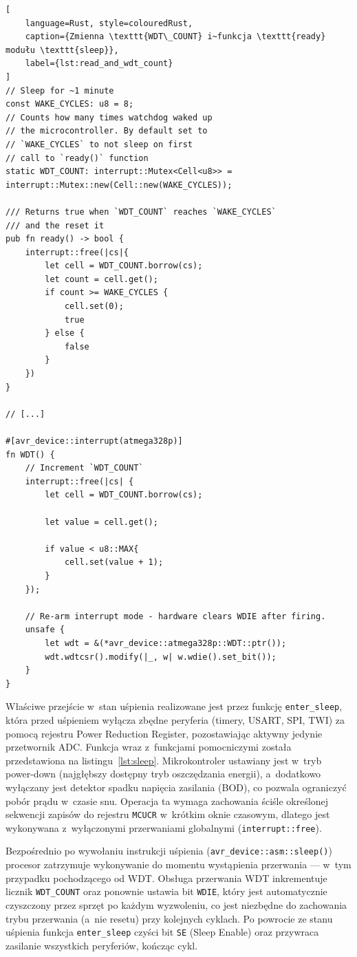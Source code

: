 \begin{lstlisting}[
    language=Rust, style=colouredRust, 
    caption={Zmienna \texttt{WDT\_COUNT} i~funkcja \texttt{ready} modułu \texttt{sleep}},
    label={lst:read_and_wdt_count}
]
// Sleep for ~1 minute
const WAKE_CYCLES: u8 = 8;
// Counts how many times watchdog waked up 
// the microcontroller. By default set to 
// `WAKE_CYCLES` to not sleep on first
// call to `ready()` function
static WDT_COUNT: interrupt::Mutex<Cell<u8>> = interrupt::Mutex::new(Cell::new(WAKE_CYCLES));

/// Returns true when `WDT_COUNT` reaches `WAKE_CYCLES`
/// and the reset it
pub fn ready() -> bool {
    interrupt::free(|cs|{
        let cell = WDT_COUNT.borrow(cs);
        let count = cell.get();
        if count >= WAKE_CYCLES {
            cell.set(0);
            true
        } else {
            false
        }
    })
}

// [...]

#[avr_device::interrupt(atmega328p)]
fn WDT() {
    // Increment `WDT_COUNT`
    interrupt::free(|cs| {
        let cell = WDT_COUNT.borrow(cs);

        let value = cell.get();
        
        if value < u8::MAX{
            cell.set(value + 1);
        }
    });

    // Re-arm interrupt mode - hardware clears WDIE after firing.
    unsafe {
        let wdt = &(*avr_device::atmega328p::WDT::ptr());
        wdt.wdtcsr().modify(|_, w| w.wdie().set_bit());
    }
}
\end{lstlisting}


Właściwe przejście w~stan uśpienia realizowane jest przez funkcję 
\texttt{enter\_sleep}, która przed uśpieniem wyłącza zbędne peryferia (timery, 
USART, SPI, TWI) za pomocą rejestru Power Reduction Register, 
pozostawiając aktywny jedynie przetwornik ADC. 
Funkcja wraz z~funkcjami pomocniczymi została przedstawiona na 
listingu~\ref{lst:sleep}. 
Mikrokontroler ustawiany 
jest w~tryb power-down (najgłębszy dostępny tryb oszczędzania energii), 
a~dodatkowo wyłączany jest detektor spadku napięcia zasilania (BOD), co 
pozwala ograniczyć pobór prądu w~czasie snu. Operacja ta wymaga zachowania 
ściśle określonej sekwencji zapisów do rejestru \texttt{MCUCR} w~krótkim oknie 
czasowym, dlatego jest wykonywana z~wyłączonymi przerwaniami globalnymi 
(\texttt{interrupt::free}).

Bezpośrednio po wywołaniu instrukcji uśpienia (\texttt{avr\_device::asm::sleep()}) 
procesor zatrzymuje wykonywanie do momentu wystąpienia przerwania — w~tym 
przypadku pochodzącego od WDT. Obsługa przerwania WDT inkrementuje licznik 
\texttt{WDT\_COUNT} oraz ponownie ustawia bit \texttt{WDIE}, który jest automatycznie 
czyszczony przez sprzęt po każdym wyzwoleniu, co jest niezbędne do 
zachowania trybu przerwania (a~nie resetu) przy kolejnych cyklach. 
Po powrocie ze stanu uśpienia funkcja \texttt{enter\_sleep} czyści bit 
\texttt{SE} (Sleep Enable) oraz przywraca zasilanie wszystkich peryferiów, kończąc cykl.

